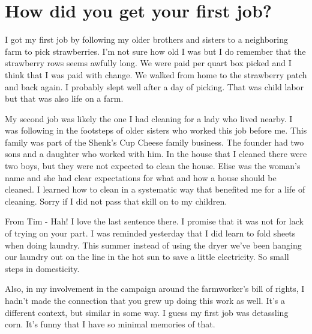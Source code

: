 \section{How did you get your first job?}
I got my first job by following my older brothers and sisters to a neighboring farm to pick strawberries.
I'm not sure how old I was but I do remember that the strawberry rows seems awfully long.
We were paid per quart box picked and I think that I was paid with change.
We walked from home to the strawberry patch and back again.
I probably slept well after a day of picking.
That was child labor but that was also life on a farm.

My second job was likely the one I had cleaning for a lady who lived nearby.
I was following in the footsteps of older sisters who worked this job before me.
This family was part of the Shenk's Cup Cheese family business.
The founder had two sons and a daughter who worked with him.
In the house that I cleaned there were two boys, but they were not expected to clean the house.
Elise was the woman's name and she had clear expectations for what and how a house should be cleaned.
I learned how to clean in a systematic way that benefited me for a life of cleaning.
Sorry if I did not pass that skill on to my children.

From Tim - Hah! I love the last sentence there.
I promise that it was not for lack of trying on your part.
I was reminded yesterday that I did learn to fold sheets when doing laundry.
This summer instead of using the dryer we've been hanging our laundry out on the line in the hot sun to save a little electricity.
So small steps in domesticity.

Also, in my involvement in the campaign around the farmworker's bill of rights, I hadn't made the connection that you grew up doing this work as well.
It's a different context, but similar in some way.
I guess my first job was detassling corn.
It's funny that I have so minimal memories of that.






